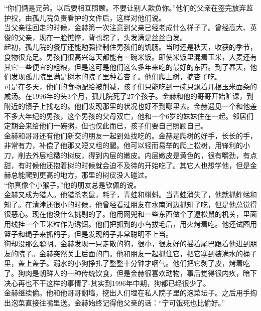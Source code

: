 “你们俩是兄弟。以后要相互照顾。不要让别人欺负你。”他们的父亲在签完放弃监护权，由孤儿院负责看护的文件后，这样对他们说。\\

当父亲往回走的时候，金赫第一次注意到父亲已经老成什么样子了。曾经高大、英俊的父亲，现在一脸憔悴，背也驼了，头发满是丝丝白发。\\

起初，孤儿院的餐厅还能勉强控制住男孩们的饥肠。当时还是秋天，收获的季节，食物很充足。男孩们很高兴每天都能有一碗米饭。即使米饭里混着玉米，大麦还有其它一些便宜的粗粮，但是这可是他们这么多年来吃的最好的东西。到了春天，他们发现孤儿院里满是树木的院子里种着杏子。他们爬上树，摘杏子吃。\\

可是在冬天，他们的食物配给被削减，孩子们只能吃到一碗只飘着几根玉米面条的咸汤。在1996年的头3个月，孤儿院死了27个孩子。金赫和他的哥哥开始旷课，到附近的镇子上找吃的。他们发现那里的状况也好不到哪里去。金赫遇见一个和他差不多大年纪的男孩，这个男孩的父母双亡，他和一个6岁的妹妹住在一起。邻居们定期会来给他们一碗粥，但也仅此而已，孩子们要自己照顾自己。\\

金赫和哥哥还有他们新交的朋友一起到处找吃的。金赫是爬树的好手，长长的手，非常有力，补偿了他那又短又粗的腿。他可以轻而易举的爬上松树，用锋利的小刀，削去外层粗糙的树皮，得到内层的嫩皮。内层嫩皮是黄色的，很有嚼劲，有点甜，有时候他还抱着树的时候就会迫不及待的开始吃了。其它人也想学他，但是金赫总能爬到更高的地方，那里的树皮没人碰过。\\

“你真像个小猴子。”他的朋友总是钦佩的说。\\

金赫又成为猎人。他猎杀老鼠，耗子，青蛙和蝌蚪。当青蛙消失了，他就抓蚱蜢和知了。在清津还很小的时候，他曾经看过朋友在水南河边抓知了吃，但是他总觉得很恶心。现在他没什么挑剔的了。他用网兜和一些东西做个了逮松鼠的机关，里面用线挂一个玉米粒作为诱饵。他们把抓到的小鸟拔毛后，用火烤着吃。他还试图用篮子和绳子来抓鸽子，但是发现鸽子非常聪明不上当。\\

狗却没那么聪明。金赫发现一只走散的狗，很小，很友好的摇着尾巴跟着他进到朋友的院子。金赫突然关上后面的门。他和朋友一起抓住它，把它塞到装满水的桶子里，盖上盖子。溺水的小狗挣扎了整整十分钟才咽气。他们把它剥了皮，烤着吃了。狗肉是朝鲜人的一种传统饮食，但是金赫很喜欢动物，事后觉得很内疚，暗下决心再也不干这样的事情了-其实到1996年中期，狗都已经很少了。\\

金赫继续偷。他和他哥哥翻墙，挖出人们埋在私人院子里的泡菜坛子。之后用手掏出泡菜直接往嘴里送。金赫始终记得他父亲的话：“宁可饿死也比偷好。”\\

